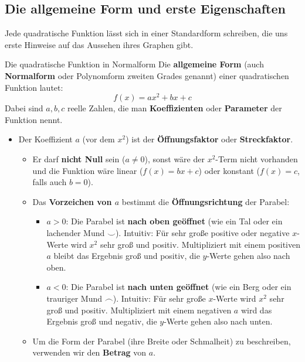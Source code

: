 \subsection{Die allgemeine Form und erste Eigenschaften}

Jede quadratische Funktion lässt sich in einer Standardform schreiben, die uns erste Hinweise auf das Aussehen ihres Graphen gibt.

\begin{merksatzumgebung}{Die quadratische Funktion in Normalform}\label{merksatz_quadratische_normalform}
Die \textbf{allgemeine Form} (auch \textbf{Normalform} oder Polynomform zweiten Grades genannt) einer quadratischen Funktion lautet:
\[ f(x) = ax^2 + bx + c \]
Dabei sind $a, b, c$ reelle Zahlen, die man \textbf{Koeffizienten} oder \textbf{Parameter} der Funktion nennt.
\begin{itemize}
    \item Der Koeffizient $a$ (vor dem $x^2$) ist der \textbf{Öffnungsfaktor} oder \textbf{Streckfaktor}.
        \begin{itemize}
            \item Er darf \textbf{nicht Null} sein ($a \neq 0$), sonst wäre der $x^2$-Term nicht vorhanden und die Funktion wäre linear ($f(x)=bx+c$) oder konstant ($f(x)=c$, falls auch $b=0$).
            \item Das \textbf{Vorzeichen von $a$} bestimmt die \textbf{Öffnungsrichtung} der Parabel:
                \begin{itemize}
                    \item $a > 0$: Die Parabel ist \textbf{nach oben geöffnet} (wie ein Tal oder ein lachender Mund $\smile$). Intuitiv: Für sehr große positive oder negative $x$-Werte wird $x^2$ sehr groß und positiv. Multipliziert mit einem positiven $a$ bleibt das Ergebnis groß und positiv, die $y$-Werte gehen also nach oben.
                    \item $a < 0$: Die Parabel ist \textbf{nach unten geöffnet} (wie ein Berg oder ein trauriger Mund $\frown$). Intuitiv: Für sehr große $x$-Werte wird $x^2$ sehr groß und positiv. Multipliziert mit einem negativen $a$ wird das Ergebnis groß und negativ, die $y$-Werte gehen also nach unten.
                \end{itemize}
            \item Um die Form der Parabel (ihre Breite oder Schmalheit) zu beschreiben, verwenden wir den \textbf{Betrag} von $a$.
                

\end{itemize}
\end{itemize}
\end{merksatzumgebung}
